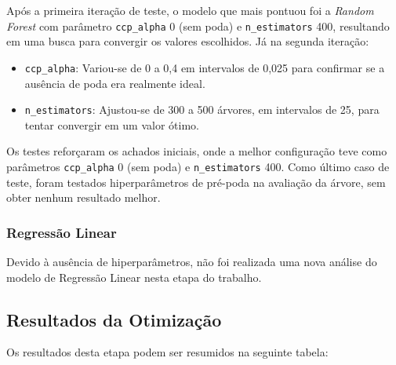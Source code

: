 \documentclass{report}
\begin{document}
Após a primeira iteração de teste, o modelo que mais pontuou foi a \textit{Random Forest} com parâmetro \texttt{ccp\_alpha} 0 (sem poda) e \texttt{n\_estimators} 400, resultando em uma busca para convergir os valores escolhidos. Já na segunda iteração:

\begin{itemize}
    \item \texttt{ccp\_alpha}:
    Variou-se de 0 a 0,4 em intervalos de 0,025 para confirmar se a ausência de poda era realmente ideal.
    \item \texttt{n\_estimators}:
    Ajustou-se de 300 a 500 árvores, em intervalos de 25, para tentar convergir em um valor ótimo.
\end{itemize}

Os testes reforçaram os achados iniciais, onde a melhor configuração teve como parâmetros \texttt{ccp\_alpha} 0 (sem poda) e \texttt{n\_estimators} 400. Como último caso de teste, foram testados hiperparâmetros de pré-poda na avaliação da árvore, sem obter nenhum resultado melhor.

\subsubsection{Regressão Linear}
Devido à ausência de hiperparâmetros, não foi realizada uma nova análise do modelo de Regressão Linear nesta etapa do trabalho.

\subsection{Resultados da Otimização}

Os resultados desta etapa podem ser resumidos na seguinte tabela:
\end{document}
